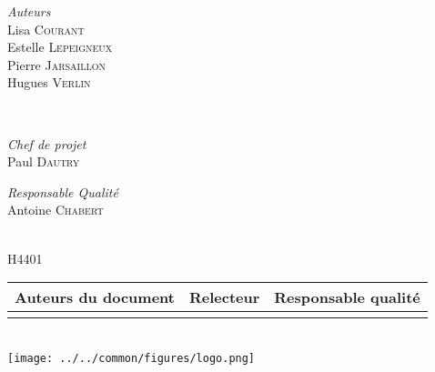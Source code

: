 \begin{titlepage}
\begin{minipage}{0.4\textwidth}
\begin{center} \large
\emph{Auteurs} \\
Lisa \textsc{Courant} \\
Estelle \textsc{Lepeigneux} \\
Pierre \textsc{Jarsaillon} \\
Hugues \textsc{Verlin} \\
\end{center}
\end{minipage}
~
\begin{minipage}{0.4\textwidth}
\begin{center} \large
\emph{Chef de projet} \\
Paul \textsc{Dautry}
\end{center}
\begin{center} \large
\emph{Responsable Qualité} \\
Antoine \textsc{Chabert}
\end{center}
\end{minipage}\\[1cm]

H4401\\[1cm]


\begin{tabular}{|m{}|m{}|m{}|}
  \hline
  \textbf{Auteurs du document} & \textbf{Relecteur} & \textbf{Responsable qualité} \\
  \hline
   & & \rule[0cm]{0cm}{5cm} \\
  \hline
\end{tabular} \\[2cm]

\texttt{[image: ../../common/figures/logo.png]}

\vfill %

\end{titlepage}
